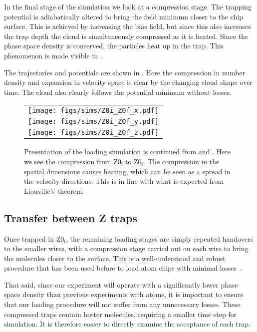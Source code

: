 In the final stage of the simulation we look at a compression stage. The
trapping potential is adiabatically altered to bring the field minimum closer
to the chip surface. This is achieved by increasing the bias field, but since
this also increases the trap depth the cloud is simultaneously compressed as it
is heated. Since the phase space density is conserved, the particles heat up in
the trap. This phenomenon is made visible in
.

The trajectories and potentials are shown in .
Here the compression in number density and expansion in velocity space is clear
by the changing cloud shape over time. The cloud also clearly follows the
potential minimum without losses.

%
\begin{figure}[p]
\centering
  \begin{tabular}{c}
    \texttt{[image: figs/sims/Z0i\_Z0f\_x.pdf]} \\
    \texttt{[image: figs/sims/Z0i\_Z0f\_y.pdf]} \\
    \texttt{[image: figs/sims/Z0i\_Z0f\_z.pdf]}
  \end{tabular}
  \caption{Presentation of the loading simulation is continued from
   and . Here we see
  the compression from $\mathrm{Z0_i}$ to $\mathrm{Z0_f}$. The compression in
  the spatial dimensions causes heating, which can be seen as a spread in the
  velocity directions. This is in line with what is expected from Liouville's
  theorem.
  }
  \label{design:fig:Z0i_Z0f}
\end{figure}

\subsection{Transfer between Z traps}
\label{design:transferbetweenzs}

Once trapped in $\mathrm{Z0_f}$, the remaining loading stages are simply
repeated handovers to the smaller wires, with a compression stage carried out
on each wire to bring the molecules closer to the surface. This is a
well-understood and robust procedure that has been used before to load atom
chips with minimal losses~\cite{Reichel2002}.

That said, since our experiment will operate with a significantly lower phase
space density than previous experiments with atoms, it is important to ensure
that our loading procedure will not suffer from any unnecessary losses. These
compressed traps contain hotter molecules, requiring a smaller time step for
simulation. It is therefore easier to directly examine the acceptance of each
trap.

